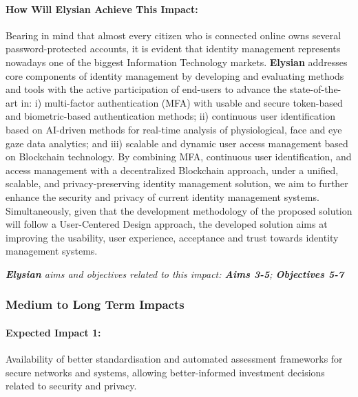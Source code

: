 \documentclass[a4paper,11pt]{article}
\newcommand{\project}[1]{\textbf{#1}\xspace}
\newcommand{\SECURITY}{\project{Elysian}}
\newcommand{\TheProject}{\SECURITY}
\begin{document}
\begin{mdframed}[backgroundcolor=gray!10]
\paragraph{How Will \TheProject{} Achieve This Impact:} Bearing in mind that almost every citizen who is connected online owns several password-protected accounts, it is evident that identity management  represents nowadays one of the biggest Information Technology markets. \TheProject{} addresses core components of identity management by developing and evaluating methods and tools with the active participation of end-users to advance the state-of-the-art in: i) multi-factor authentication (MFA) with usable and secure token-based and biometric-based authentication methods; ii) continuous user identification based on AI-driven methods for real-time analysis of physiological, face and eye gaze data analytics; and iii) scalable and dynamic user access management based on Blockchain technology.  
By combining MFA, continuous user identification, and access management with a decentralized Blockchain approach, under a unified, scalable, and privacy-preserving identity management solution, we aim to further enhance the security and privacy of current identity management systems. Simultaneously, given that the development methodology of the proposed solution will follow a User-Centered Design approach, the developed solution aims at improving the usability, user experience, acceptance and trust towards identity management systems.

\emph{\TheProject{} aims and objectives related to this impact: \textbf{Aims 3-5}; \textbf{Objectives 5-7} }
\end{mdframed}

\subsubsection{Medium to Long Term Impacts}

\begin{mdframed}[backgroundcolor=blue!5]
\paragraph{Expected Impact 1:}
Availability of better standardisation and automated assessment frameworks for secure networks and systems, allowing better-informed investment decisions related to security and privacy.
\end{mdframed}
\end{document}
